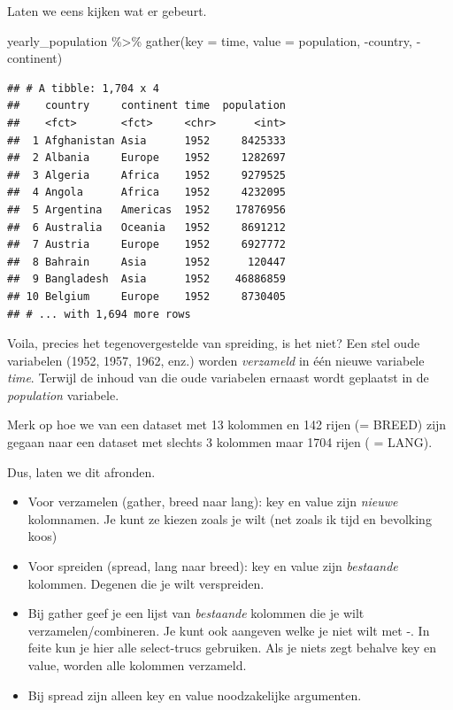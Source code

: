 \documentclass[]{tufte-book}
\newenvironment{Shaded}{}{}
\newcommand{\AttributeTok}[1]{\textcolor[rgb]{0.49,0.56,0.16}{#1}}
\newcommand{\FunctionTok}[1]{\textcolor[rgb]{0.02,0.16,0.49}{#1}}
\newcommand{\NormalTok}[1]{#1}
\newcommand{\SpecialCharTok}[1]{\textcolor[rgb]{0.25,0.44,0.63}{#1}}
\providecommand{\tightlist}{%
  \setlength{\itemsep}{0pt}\setlength{\parskip}{0pt}}
\begin{document}
Laten we eens kijken wat er gebeurt.

\begin{Shaded}
\begin{Highlighting}[]
\NormalTok{yearly\_population }\SpecialCharTok{\%\textgreater{}\%}
  \FunctionTok{gather}\NormalTok{(}\AttributeTok{key =}\NormalTok{ time, }\AttributeTok{value =}\NormalTok{ population, }\SpecialCharTok{{-}}\NormalTok{country, }\SpecialCharTok{{-}}\NormalTok{continent)}
\end{Highlighting}
\end{Shaded}

\begin{verbatim}
## # A tibble: 1,704 x 4
##    country     continent time  population
##    <fct>       <fct>     <chr>      <int>
##  1 Afghanistan Asia      1952     8425333
##  2 Albania     Europe    1952     1282697
##  3 Algeria     Africa    1952     9279525
##  4 Angola      Africa    1952     4232095
##  5 Argentina   Americas  1952    17876956
##  6 Australia   Oceania   1952     8691212
##  7 Austria     Europe    1952     6927772
##  8 Bahrain     Asia      1952      120447
##  9 Bangladesh  Asia      1952    46886859
## 10 Belgium     Europe    1952     8730405
## # ... with 1,694 more rows
\end{verbatim}

Voila, precies het tegenovergestelde van spreiding, is het niet? Een stel oude variabelen (1952, 1957, 1962, enz.) worden \emph{verzameld} in één nieuwe variabele \emph{time}. Terwijl de inhoud van die oude variabelen ernaast wordt geplaatst in de \emph{population} variabele.

Merk op hoe we van een dataset met 13 kolommen en 142 rijen (= BREED) zijn gegaan naar een dataset met slechts 3 kolommen maar 1704 rijen ( = LANG).

Dus, laten we dit afronden.

\begin{itemize}
\tightlist
\item
  Voor verzamelen (gather, breed naar lang): key en value zijn \emph{nieuwe} kolomnamen. Je kunt ze kiezen zoals je wilt (net zoals ik tijd en bevolking koos)
\item
  Voor spreiden (spread, lang naar breed): key en value zijn \emph{bestaande} kolommen. Degenen die je wilt verspreiden.
\item
  Bij gather geef je een lijst van \emph{bestaande} kolommen die je wilt verzamelen/combineren. Je kunt ook aangeven welke je niet wilt met -. In feite kun je hier alle select-trucs gebruiken. Als je niets zegt behalve key en value, worden alle kolommen verzameld.
\item
  Bij spread zijn alleen key en value noodzakelijke argumenten.
\end{itemize}
\end{document}
